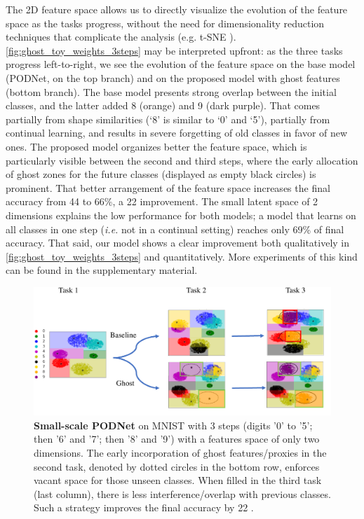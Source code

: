 The 2D feature space allows us to directly visualize the evolution of the feature space as the tasks
progress, without the need for dimensionality reduction techniques that complicate the analysis
(e.g. t-SNE \citep{maaten2008tsne}). \autoref{fig:ghost_toy_weights_3steps} may be interpreted
upfront: as the three tasks progress left-to-right, we see the evolution of the feature space on the
base model (\ac{PODNet}, on the top branch) and on the proposed model with ghost features (bottom
branch). The base model presents strong overlap between the initial classes, and the latter added  8
({\color{orange}orange}) and 9 ({\color{violet}dark purple}). That comes partially from shape
similarities (‘8’ is similar to ‘0’ and ‘5’), partially from continual learning, and results in
severe forgetting of old classes in favor of new ones. The proposed model organizes better the
feature space, which is particularly visible between the second and third steps, where the early
allocation of ghost zones for the future classes (displayed as empty black circles) is prominent.
That better arrangement of the feature space increases the final accuracy from 44 to 66\%, a 22 \pp
improvement. The small latent space of 2 dimensions explains the low performance for both models; a
model that learns on all classes in one step (\textit{i.e.} not in a continual setting) reaches only
69\% of final accuracy. That said, our model shows a clear improvement both qualitatively in
\autoref{fig:ghost_toy_weights_3steps} and quantitatively. More experiments of this kind can be
found in the supplementary material.

\begin{figure}
    \centering
    \includegraphics[width=0.8\linewidth]{images/ghost/toy_model_6_2_2.pdf}
    \caption{\textbf{Small-scale PODNet} on MNIST with 3 steps (digits '0' to '5'; then '6' and '7';
        then '8' and '9') with a features space of only two dimensions. The early incorporation of
        ghost features/proxies in the second task, denoted by dotted circles in the bottom row,
        enforces vacant space for those unseen classes. When filled in the third task (last column),
        there is less interference/overlap with previous classes. Such a strategy improves the final
        accuracy by 22 \pp.}
    \label{fig:ghost_toy_weights_3steps}
\end{figure}


